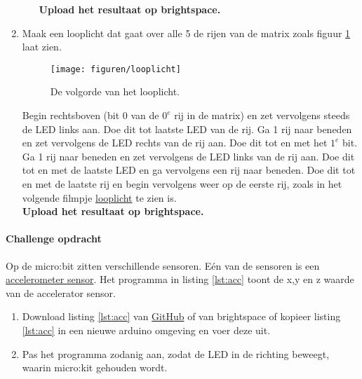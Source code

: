\begin{enumerate}
\begin{enumerate}
\textbf{Upload het resultaat op brightspace.}
\end{enumerate}\label{opdr:loppl}
\item Maak een looplicht dat gaat over alle 5 de rijen van de matrix zoals figuur \ref{fig:loopl} laat zien.

\begin{figure}[H]
	\captionsetup{justification=centering}
\texttt{[image: figuren/looplicht]}
\centering
\caption{De volgorde van het looplicht.}
\label{fig:loopl}
\end{figure}

Begin rechtsboven (bit 0 van de ${0^{e}}$ rij in de matrix) en zet vervolgens steeds de LED links aan. Doe dit tot laatste LED van de rij.
Ga 1 rij naar beneden en zet vervolgens de LED rechts van de rij aan. Doe dit tot en met het $1^{e}$ bit.
Ga 1 rij naar beneden en zet vervolgens de LED links van de rij aan. Doe dit tot en met de laatste LED en ga vervolgens een rij naar beneden.
Doe dit tot en met de laatste rij en begin vervolgens weer op de eerste rij, zoals in het volgende filmpje \href{https://www.youtube.com/shorts/8ZyYWEiXsm0} {
	looplicht}
	te zien is.\\
\textbf{Upload het resultaat op brightspace.}
\end{enumerate}

\paragraph{Challenge opdracht}\label{opdr:accSens}

Op de micro:bit zitten verschillende sensoren. Eén van de sensoren is een \href{https://youtu.be/9WAckt2vrrQ}{accelerometer sensor}.
Het programma in listing \ref{lst:acc} toont de x,y en z waarde van de accelerator sensor.
\begin{enumerate}

	\item Download  listing \ref{lst:acc} van \href{https://github.com/JohnVi-hhs/embsysP/tree/main/voorbeelden/accelerator.ino}{ GitHub} of van brightspace of kopieer listing \ref{lst:acc} in een nieuwe arduino omgeving en voer deze uit.
	\item Pas het programma zodanig aan, zodat de LED in de richting beweegt, waarin micro:kit gehouden wordt.

	\end{enumerate}


